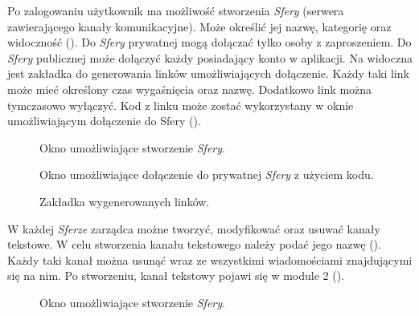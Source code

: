
Po zalogowaniu użytkownik ma możliwość stworzenia \textit{Sfery} (serwera zawierającego kanały komunikacyjne). Może
określić jej nazwę, kategorię oraz widoczność (). Do \textit{Sfery} prywatnej mogą dołączać
tylko osoby z zaproszeniem. Do \textit{Sfery} publicznej może dołączyć każdy posiadający konto w aplikacji. Na
 widoczna jest zakładka do generowania linków umożliwiających dołączenie. Każdy taki link może
mieć określony czas wygaśnięcia oraz nazwę. Dodatkowo link można tymczasowo wyłączyć. Kod z linku może zostać
wykorzystany w oknie umożliwiającym dołączenie do Sfery ().
%
\begin{figure}[H]
  \centering
  \caption{Okno umożliwiające stworzenie \textit{Sfery}.}
  \label{fig:create-sphere}
\end{figure}
%
\begin{figure}[H]
  \centering
  \caption{Okno umożliwiające dołączenie do prywatnej \textit{Sfery} z użyciem kodu.}
  \label{fig:join-to-sphere}
\end{figure}
%
\begin{figure}[H]
  \centering
  \caption{Zakładka wygenerowanych linków.}
  \label{fig:join-links}
\end{figure}


W każdej \textit{Sferze} zarządca możne tworzyć, modyfikować oraz usuwać kanały tekstowe. W celu stworzenia kanału
tekstowego należy podać jego nazwę (). Każdy taki kanał można usunąć wraz ze wszystkimi
wiadomościami znajdującymi się na nim. Po stworzeniu, kanał tekstowy pojawi się w module 2 ().
%
\begin{figure}[H]
  \centering
  \caption{Okno umożliwiające stworzenie \textit{Sfery}.}
  \label{fig:create-text-channel}
\end{figure}
